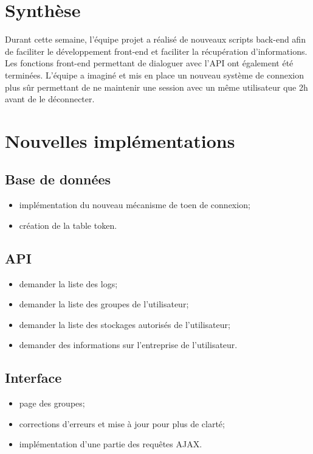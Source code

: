 \documentclass[a4paper, 12pt]{report}
\begin{document}
	\tableofcontents


	\newpage

	\chapter*{Synthèse}
		Durant cette semaine, l’équipe projet a réalisé de nouveaux scripts back-end afin de faciliter le développement front-end et faciliter la récupération d’informations. Les fonctions front-end permettant de dialoguer avec l’API ont également été terminées. L’équipe a imaginé et mis en place un nouveau système de connexion plus sûr permettant de ne maintenir une session avec un même utilisateur que 2h avant de le déconnecter.



	 \chapter{Nouvelles implémentations}
	 	\section{Base de données}
	 		\begin{itemize}
	 			\item implémentation du nouveau mécanisme de toen de connexion;
				\item création de la table token.

	 		\end{itemize}

		\section{API}
			\begin{itemize}
				\item demander la liste des logs;
				\item demander la liste des groupes de l’utilisateur;
				\item demander la liste des stockages autorisés de l’utilisateur;
				\item demander des informations sur l’entreprise de l’utilisateur.


			\end{itemize}

		\section{Interface}
			\begin{itemize}
				\item page des groupes;
				\item corrections d’erreurs et mise à jour pour plus de clarté;
				\item implémentation d’une partie des requêtes AJAX.


			\end{itemize}
\end{document}
